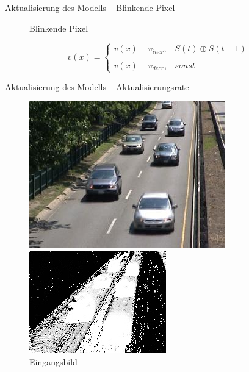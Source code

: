 \documentclass[hyperref={pdfpagelabels=false}]{beamer}
\begin{document}
\begin{frame}[t]{Aktualisierung des Modells -- Blinkende Pixel}
\begin{figure}
\begin{minipage}{0.45\linewidth}
			\caption*{Blinkende Pixel}
		\end{minipage}
	\end{figure}
	\bigskip
	\begin{equation*}
		v(x)= 	\left\{
				\begin{array}{ll} 
					v(x) + v_{incr}, &  S(t) \oplus S(t-1) \\
					\\
					v(x) - v_{decr}, & sonst
				\end{array}
			\right .
	\end{equation*}
\end{frame}

\begin{frame}[t]{Aktualisierung des Modells -- Aktualisierungsrate}
	\vspace{1.65em}
	\begin{figure}
		\centering
		\begin{minipage}{0.45\linewidth}
			\includegraphics[width=1\linewidth]{Abbildungen/Eingang3.jpg}
			\caption*{Eingangsbild}
		\end{minipage}
		\begin{minipage}{0.45\linewidth}
			\includegraphics[width=1\linewidth]{Abbildungen/threshold.jpg}

\end{minipage}
\end{figure}
\end{frame}
\end{document}
